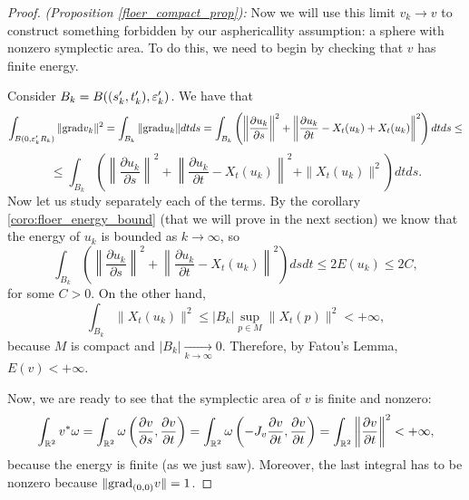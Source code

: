 \begin{proof} {\it (Proposition \ref{floer_compact_prop}):}
Now we will use this limit $v_k \rightarrow v$ to construct something forbidden by our asphericallity assumption: a sphere with nonzero symplectic area. To do this, we need to begin by checking that $v$ has finite energy.

Consider $B_k = B((s_k',t_k'),\varepsilon_k')$. We have that
\[\int_{B(0,\varepsilon_k'R_k)} \|\mathrm{grad} v_k\|^2 = \int_{B_k} \|\mathrm{grad} u_k\| dt ds = \int_{B_k} \left( \left\| \frac{\partial u_k}{\partial s} \right\|^2 + \left\| \frac{\partial u_k}{\partial t} - X_t(u_k) + X_t(u_k) \right\|^2 \right)dt ds \leq\]
\[\leq \int_{B_k} \left( \left\|\frac{\partial u_k}{\partial s}\right\|^2 + \left\|\frac{\partial u_k}{\partial t} - X_t(u_k) \right\|^2 + \|X_t(u_k)\|^2 \right) dt ds .\]
Now let us study separately each of the terms. By the corollary \ref{coro:floer_energy_bound} (that we will prove in the next section) we know that the energy of $u_k$ is bounded as $k \rightarrow \infty$, so
\[\int_{B_k} \left( \left\| \frac{\partial u_k}{\partial s} \right\|^2 + \left\| \frac{\partial u_k}{\partial t} - X_t(u_k) \right\|^2 \right) ds dt \leq 2E(u_k) \leq 2C,\]
for some $C > 0$. On the other hand,
\[\int_{B_k} \|X_t(u_k)\|^2 \leq |B_k| \sup_{p \in M} \|X_t(p)\|^2 < +\infty ,\]
because $M$ is compact and $|B_k| \xrightarrow[k \rightarrow \infty]{} 0$. Therefore, by Fatou's Lemma, $E(v) < +\infty$.

Now, we are ready to see that the symplectic area of $v$ is finite and nonzero:
\[\int_{\mathbb{R}^2} v^{\ast} \omega = \int_{\mathbb{R}^2} \omega\left(\frac{\partial v}{\partial s}, \frac{\partial v}{\partial t}\right) = \int_{\mathbb{R}^2} \omega\left(-J_v \frac{\partial v}{\partial t}, \frac{\partial v}{\partial t}\right) = \int_{\mathbb{R}^2} \left\| \frac{\partial v}{\partial t} \right\|^2 < + \infty ,\]
because the energy is finite (as we just saw). Moreover, the last integral has to be nonzero because $\|\mathrm{grad}_{(0,0)}v\| = 1$.


\end{proof}
